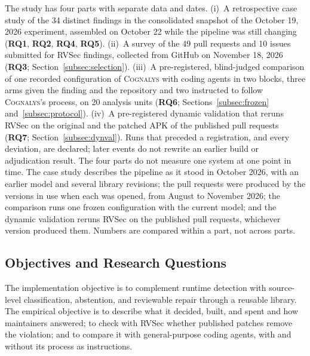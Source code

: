 \documentclass[conference]{IEEEtran}
\newcommand{\system}{\textsc{Cognalys}}
\newcommand{\researchq}[1]{\textbf{RQ#1}}
\begin{document}
The study has four parts with separate data and dates. (i)~A retrospective
case study of the 34 distinct findings in the consolidated snapshot of the
October 19, 2026 experiment, assembled on October 22 while the pipeline was
still changing (\researchq{1}, \researchq{2}, \researchq{4}, \researchq{5}).
(ii)~A survey of the 49 pull requests and 10 issues submitted for RVSec
findings, collected from GitHub on November 18, 2026 (\researchq{3};
Section~\ref{subsec:selection}). (iii)~A pre-registered, blind-judged
comparison of one recorded configuration of {\system} with coding agents in two
blocks, three arms given the finding and the repository and two instructed
to follow {\system}'s process, on 20 analysis units
(\researchq{6}; Sections~\ref{subsec:frozen} and~\ref{subsec:protocol}).
(iv)~A pre-registered dynamic validation that reruns RVSec on the original and
the patched APK of the published pull requests (\researchq{7};
Section~\ref{subsec:dynval}). Runs that preceded a registration, and every
deviation, are declared; later events do not rewrite an earlier build or
adjudication result. The four parts do not measure one system at one point in
time. The case study describes the pipeline as it stood in October 2026, with
an earlier model and several library revisions; the pull requests were
produced by the versions in use when each was opened, from August to November
2026; the comparison runs one frozen configuration with the current model; and
the dynamic validation reruns RVSec on the published pull requests, whichever
version produced them. Numbers are compared within a part, not across parts.

\subsection{Objectives and Research Questions}
\label{subsec:rqs}

The implementation objective is to complement runtime detection with
source-level classification, abstention, and reviewable repair through a
reusable library. The empirical objective is to describe what it decided,
built, and spent and how maintainers answered; to check with RVSec whether
published patches remove the violation; and to compare it with
general-purpose coding agents, with and without its process as instructions.
\end{document}
